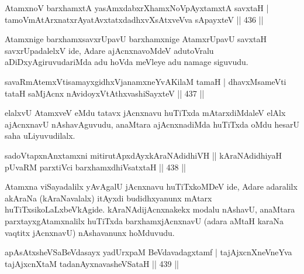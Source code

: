 \begin{shl}
AtamxnoV barxhamxtA yasAmxdabxrXhamxNoV\s pAyxtamxtA savxtaH |
tamoVmAtArxnatxrAyatAvxtatxdadhxvXsAtxveVva sA\s \s payxteV \hfill  || 436 ||
\end{shl}

\begin{artha}
Atamxnige barxhamxsavxrUpavU barxhamxnige AtamxrUpavU savxtaH savxrUpadalelxV ide, Adare ajAcnxnavoMdeV adutoVralu aDiDxyAgiruvudariMda adu hoVda meVleye adu namage siguvudu.
\end{artha}

\begin{shl}
savaRmAtemxVtisamayxgidhxVjanamxneYvAKilaM tamaH |
dhavxMsameVti tataH saMjAcnx nAvidoyxVtAthx\s vashiSayxteV \hfill  || 437 ||
\end{shl}

\begin{artha}
elalxvU AtamxveV eMdu tatavx jAcnxnavu huTiTxda mAtarxdiMdaleV elAlx ajAcnxnavU nAshavAguvudu, anaMtara ajAcnxnadiMda huTiTxda oMdu hesarU saha uLiyuvudilalx.
\end{artha}

\begin{shl}
sadoVtapxnAnx\s \s tamxni mitirutApxdAyx\s kAraNAdidhiVH ||
kAraNAdidhiyaH \footnotemark[1]pUvaRM parxtiVci barxhamxdhiVsatxtaH \hfill  || 438 ||
\end{shl}


\begin{artha}
Atamxna viSayadalilx yAvAgalU jAcnxnavu huTiTxkoMDeV ide, Adare adaralilx akAraNa (kAraNavalalx) itAyxdi budidhxyanunx mAtarx huTiTxsikoLaLxbeVkAgide. kAraNAdijAcnxnakekx modalu nAshavU, anaMtara parxtayxgAtamxnalilx huTiTxda barxhamxjAcnxnavU (adara aMtaH karaNa vaqtitx jAcnxnavU) nAshavanunx hoMduvudu.
\end{artha}

\begin{shl}
apAsAtxsheVSaBeVdasayx yadUrxpaM BeVdavadagxtamf |
tajAjxcnXneVneYva tajAjxcnXtaM tadanAyxnavasheVSataH \hfill  || 439 ||
\end{shl}

